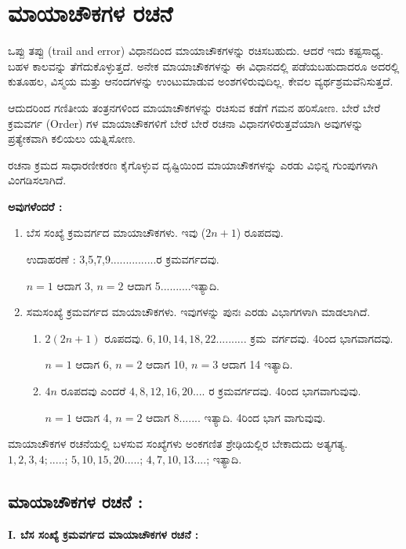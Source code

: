 \chapter{ಮಾಯಾಚೌಕಗಳ ರಚನೆ}
ಒಪ್ಪು ತಪ್ಪು (trail and error) ವಿಧಾನದಿಂದ ಮಾಯಾಚೌಕಗಳನ್ನು ರಚಿಸಬಹುದು. ಆದರೆ ಇದು ಕಷ್ಟಸಾಧ್ಯ. ಬಹಳ ಕಾಲವನ್ನು ತೆಗೆದುಕೊಳ್ಳುತ್ತದೆ. ಅನೇಕ ಮಾಯಾಚೌಕಗಳನ್ನು ಈ ವಿಧಾನದಲ್ಲಿ ಪಡೆಯಬಹುದಾದರೂ ಅದರಲ್ಲಿ ಕುತೂಹಲ, ವಿಸ್ಮಯ ಮತ್ತು ಆನಂದಗಳನ್ನು ಉಂಟುಮಾಡುವ ಅಂಶಗಳಿರುವುದಿಲ್ಲ. ಕೇವಲ ವ್ಯರ್ಥಶ್ರಮವೆನಿಸುತ್ತದೆ.
\medskip

ಆದುದರಿಂದ ಗಣಿತೀಯ ತಂತ್ರನಗಳಿಂದ ಮಾಯಾಚೌಕಗಳನ್ನು ರಚಿಸುವ ಕಡೆಗೆ ಗಮನ ಹರಿಸೋಣ. ಬೇರೆ ಬೇರೆ ಕ್ರಮವರ್ಗ (Order) ಗಳ ಮಾಯಾಚೌಕಗಳಿಗೆ ಬೇರೆ ಬೇರೆ ರಚನಾ ವಿಧಾನಗಳಿರುತ್ತವೆಯಾಗಿ ಅವುಗಳನ್ನು ಪ್ರತ್ಯೇಕವಾಗಿ ಕಲಿಯಲು ಯತ್ನಿಸೋಣ.

\medskip
ರಚನಾ ಕ್ರಮದ ಸಾಧಾರಣೀಕರಣ ಕೈಗೊಳ್ಳುವ ದೃಷ್ಟಿಯಿಂದ ಮಾಯಾಚೌಕಗಳನ್ನು \break ಎರಡು ವಿಭಿನ್ನ ಗುಂಪುಗಳಾಗಿ ವಿಂಗಡಿಸಲಾಗಿದೆ.

\bigskip
\noindent \textbf{ಅವುಗಳೆಂದರೆ :}

\begin{enumerate}
	\item ಬೆಸ ಸಂಖ್ಯೆ ಕ್ರಮವರ್ಗದ ಮಾಯಾಚೌಕಗಳು. ಇವು ($2n+1$) ರೂಪದವು.

	ಉದಾಹರಣೆ : 3,5,7,9...............ರ ಕ್ರಮವರ್ಗದವು.

	$n=1$ ಆದಾಗ 3, $n=2$ ಆದಾಗ 5..........ಇತ್ಯಾದಿ.
	\item ಸಮಸಂಖ್ಯೆ ಕ್ರಮವರ್ಗದ ಮಾಯಾಚೌಕಗಳು. ಇವುಗಳನ್ನು ಪುನಃ ಎರಡು ವಿಭಾಗಗಳಾಗಿ ಮಾಡಲಾಗಿದೆ.
	\begin{enumerate}
		\item $2(2n+1)$ ರೂಪದವು. $6,10,14,18,22..........$ \hbox{ಕ್ರಮ ವರ್ಗದವು.} 4ರಿಂದ ಭಾಗವಾಗದವು.

		$n=1$ ಆದಾಗ 6, $n=2$ ಆದಾಗ 10, $n=3$ ಆದಾಗ 14 ಇತ್ಯಾದಿ.

		\item $4n$ ರೂಪದವು ಎಂದರೆ $4,8,12,16,20....$ ರ ಕ್ರಮವರ್ಗದವು. 4ರಿಂದ ಭಾಗವಾಗುವುವು.

		$n=1$ ಆದಾಗ 4, $n=2$ ಆದಾಗ $8.......$ ಇತ್ಯಾದಿ. 4ರಿಂದ ಭಾಗ ವಾಗುವುವು.
	\end{enumerate}
\end{enumerate}

ಮಾಯಾಚೌಕಗಳ ರಚನೆಯಲ್ಲಿ ಬಳಸುವ ಸಂಖ್ಯೆಗಳು ಅಂಕಗಣಿತ ಶ್ರೇಢಿಯಲ್ಲಿರ ಬೇಕಾದುದು ಅತ್ಯಗತ್ಯ. $1,2,3,4; .....$; $5,10,15,20.....$; $4,7,10,13....$; ಇತ್ಯಾದಿ.
\eject

\section*{ಮಾಯಾಚೌಕಗಳ ರಚನೆ :}

\textbf{I. ಬೆಸ ಸಂಖ್ಯೆ ಕ್ರಮವರ್ಗದ ಮಾಯಾಚೌಕಗಳ ರಚನೆ :}

